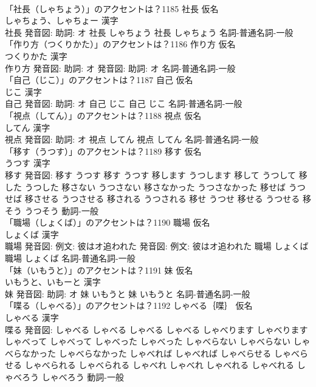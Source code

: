 \documentclass[8pt]{extreport}
\begin{document}
\begin{CJK}{UTF8}{min}
\\	「社長（しゃちょう）」のアクセントは？1185	社長 仮名　
\\	しゃちょう、しゃちょー 漢字　
\\	社長 発音図: 助詞: オ	社長 しゃちょう		社長 しゃちょう				名詞-普通名詞-一般 
\\	「作り方（つくりかた）」のアクセントは？1186	作り方 仮名　
\\	つくりかた 漢字　
\\	作り方 発音図: 助詞: オ 発音図: 助詞: オ							名詞-普通名詞-一般 
\\	「自己（じこ）」のアクセントは？1187	自己 仮名　
\\	じこ 漢字　
\\	自己 発音図: 助詞: オ	自己 じこ		自己 じこ				名詞-普通名詞-一般 
\\	「視点（してん）」のアクセントは？1188	視点 仮名　
\\	してん 漢字　
\\	視点 発音図: 助詞: オ	視点 してん		視点 してん				名詞-普通名詞-一般 
\\	「移す（うつす）」のアクセントは？1189	移す 仮名　
\\	うつす 漢字　
\\	移す 発音図:	移す うつす		移す うつす 移します うつします 移して うつして 移した うつした 移さない うつさない 移さなかった うつさなかった 移せば うつせば 移させる うつさせる 移される うつされる 移せ うつせ 移せる うつせる 移そう うつそう				動詞-一般 
\\	「職場（しょくば）」のアクセントは？1190	職場 仮名　
\\	しょくば 漢字　
\\	職場 発音図: 例文: 彼はオ追われた 発音図: 例文: 彼はオ追われた	職場 しょくば		職場 しょくば				名詞-普通名詞-一般 
\\	「妹（いもうと）」のアクセントは？1191	妹 仮名　
\\	いもうと、いもーと 漢字　
\\	妹 発音図: 助詞: オ	妹 いもうと		妹 いもうと				名詞-普通名詞-一般 
\\	「喋る（しゃべる）」のアクセントは？1192	しゃべる｛喋｝ 仮名　
\\	しゃべる 漢字　
\\	喋る 発音図:	しゃべる しゃべる		しゃべる しゃべる しゃべります しゃべります しゃべって しゃべって しゃべった しゃべった しゃべらない しゃべらない しゃべらなかった しゃべらなかった しゃべれば しゃべれば しゃべらせる しゃべらせる しゃべられる しゃべられる しゃべれ しゃべれ しゃべれる しゃべれる しゃべろう しゃべろう				動詞-一般 

\end{CJK}
\end{document}
